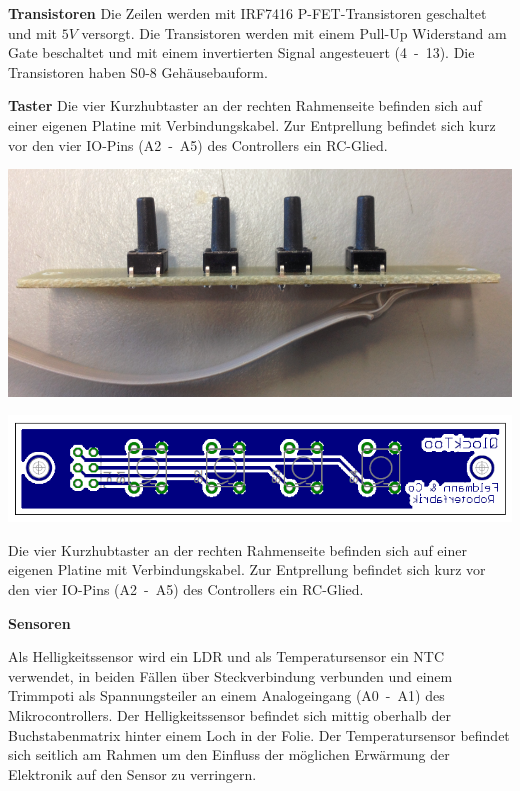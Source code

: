 \begin{multicols}{2}
\textbf{Transistoren} Die Zeilen werden mit IRF7416 P-FET-Transistoren geschaltet und mit $5V$ versorgt. Die Transistoren werden mit einem Pull-Up Widerstand am Gate beschaltet und mit einem invertierten Signal angesteuert (4~-~13). Die Transistoren haben S0-8 Gehäusebauform. 

\textbf{Taster} Die vier Kurzhubtaster an der rechten Rahmenseite befinden sich auf einer eigenen Platine mit Verbindungskabel. Zur Entprellung befindet sich kurz vor den vier IO-Pins (A2~-~A5) des Controllers ein RC-Glied. 

{
\centering 
\includegraphics[width=0.9\columnwidth]{Abbildungen/Konstruktion/Taster02} 

}

{
\centering 
\includegraphics[width=0.8\columnwidth]{Abbildungen/Elektronik/Taster01} 

}

Die vier Kurzhubtaster an der rechten Rahmenseite befinden sich auf einer eigenen Platine mit Verbindungskabel. Zur Entprellung befindet sich kurz vor den vier IO-Pins (A2~-~A5) des Controllers ein RC-Glied. 

\textbf{Sensoren}

Als Helligkeitssensor wird ein LDR und als Temperatursensor ein NTC verwendet, in beiden Fällen über Steckverbindung verbunden und einem Trimmpoti als Spannungsteiler an einem Analogeingang (A0~-~A1) des Mikrocontrollers. Der Helligkeitssensor befindet sich mittig oberhalb der Buchstabenmatrix hinter einem Loch in der Folie. Der Temperatursensor befindet sich seitlich am Rahmen um den Einfluss der möglichen Erwärmung der Elektronik auf den Sensor zu verringern. \newline


\end{multicols}
